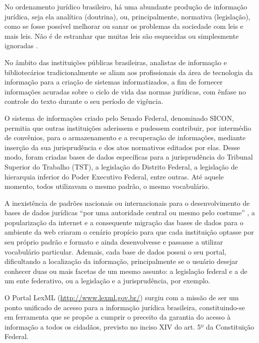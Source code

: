 \documentclass[a4paper,11pt,openright,twoside,english,brazil]{abntex2}
\begin{document}
\begin{citacao}
No ordenamento jurídico brasileiro, há uma abundante produção de informação
jurídica, seja ela analítica (doutrina), ou, principalmente, normativa
(legislação), como se fosse possível melhorar ou sanar os problemas da
sociedade com leis e mais leis. Não é de estranhar que muitas leis são
esquecidas ou simplesmente ignoradas \cite[p.~98]{passos2009}.
\end{citacao}

No âmbito das instituições públicas brasileiras, analistas de informação e
bibliotecários tradicionalmente se aliam aos profissionais da área de tecnologia
da informação para a criação de sistemas informatizados, a fim de fornecer
informações acuradas sobre o ciclo de vida das normas jurídicas, com ênfase no
controle do texto durante o seu período de vigência.

O sistema de informações criado pelo Senado Federal, denominado SICON, permitia
que outras instituições aderissem e pudessem contribuir, por intermédio de
convênios, para o armazenamento e a recuperação de informações, mediante
inserção da sua jurisprudência e dos atos normativos editados por elas. Desse
modo, foram criadas bases de dados específicas para a jurisprudência do Tribunal
Superior do Trabalho (TST), a legislação do Distrito Federal, a legislação de
hierarquia inferior do Poder Executivo Federal, entre outras. Até aquele
momento, todos utilizavam o mesmo padrão, o mesmo vocabulário.

A inexistência de padrões nacionais ou internacionais para o desenvolvimento de
bases de dados jurídicas ``por uma autoridade central ou mesmo pelo costume''
\cite[p.~60]{almeida-filho2005}, a popularização da internet e a consequente
migração das bases de dados para o ambiente da web criaram o cenário propício
para que cada instituição optasse por seu próprio padrão e formato e ainda
desenvolvesse e passasse a utilizar vocabulário particular. Ademais, cada base
de dados possui o seu portal, dificultando a localização da informação,
principalmente se o usuário desejar conhecer duas ou mais facetas de um mesmo
assunto: a legislação federal e a de um ente federativo, ou a legislação e a
jurisprudência, por exemplo.

O Portal LexML (\url{http://www.lexml.gov.br/}) surgiu com a missão de ser um
ponto unificado de acesso para a informação jurídica brasileira, constituindo-se em
ferramenta que se propõe a cumprir o preceito da garantia do acesso à informação
a todos os cidadãos, previsto no inciso XIV do art. 5º da Constituição Federal.
\end{document}
